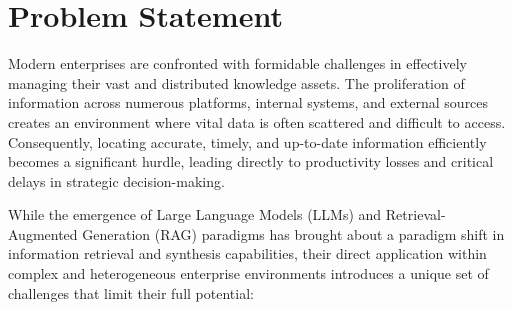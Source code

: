 \documentclass[default]{sn-jnl}%
\begin{document}
\section*{Problem Statement}
Modern enterprises are confronted with formidable challenges in effectively managing their vast and distributed knowledge assets. The proliferation of information across numerous platforms, internal systems, and external sources creates an environment where vital data is often scattered and difficult to access. Consequently, locating accurate, timely, and up-to-date information efficiently becomes a significant hurdle, leading directly to productivity losses and critical delays in strategic decision-making.

While the emergence of Large Language Models (LLMs) and Retrieval-Augmented Generation (RAG) paradigms has brought about a paradigm shift in information retrieval and synthesis capabilities, their direct application within complex and heterogeneous enterprise environments introduces a unique set of challenges that limit their full potential:
\end{document}
